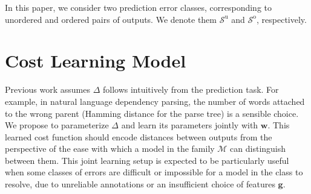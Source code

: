 \documentclass{article} %
\newcommand{\unorderedS}{\mathcal{S}^{\mathrm{u}}}
\newcommand{\orderedS}{\mathcal{S}^{\mathrm{o}}}
\begin{document}
In this paper, we consider two prediction error classes, corresponding
to unordered and ordered pairs of outputs.  We denote them
$\unorderedS$ and $\orderedS$, respectively.  





\section{Cost Learning Model}
\label{costLearningModel}


Previous work assumes $\Delta$ follows intuitively from the prediction
task.  For example, in natural language dependency parsing, the number
of words attached to the wrong parent (Hamming distance for the parse
tree) is a sensible choice.  
We propose to parameterize $\Delta$ and
learn its parameters jointly with $\mathbf{w}$.  This learned cost
function should encode distances between outputs from the perspective
of the ease with which a model in the family $\mathcal{M}$
can distinguish between them.
This joint learning setup is expected to be particularly useful when
some classes of errors are difficult or impossible for a model in the
class to resolve, due to unreliable annotations or an insufficient
choice of features $\mathbf{g}$.
\end{document}
